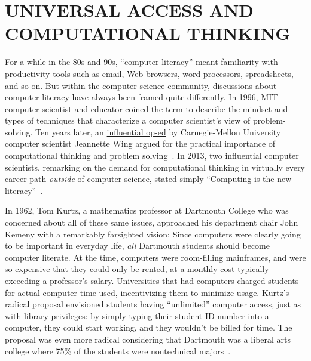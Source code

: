 
\section{UNIVERSAL ACCESS AND COMPUTATIONAL THINKING}




For a while in the 80s and 90s, ``computer literacy'' meant familiarity
with productivity tools such as email, Web browsers, word processors,
spreadsheets, and so on.
But within the computer science community, discussions about computer
literacy have always been framed quite differently.
In 1996, MIT computer scientist and educator  coined
the term  to describe the mindset and types of
techniques that characterize a computer scientist's view of
problem-solving.
Ten years later, an
\href{http://www.cs.cmu.edu/afs/cs/usr/wing/www/publications/Wing06.pdf}{influential
op-ed} by Carnegie-Mellon University computer scientist Jeannette Wing
argued for the practical importance of computational thinking and
problem solving~\cite{wing_computational_thinking}.
In 2013, two influential computer scientists, remarking on the demand
for computational thinking in virtually every career path \emph{outside}
of computer science,
stated simply
``Computing is the new
literacy''~\cite{ieee_computer_special_issue_computing_education}.

In 1962, Tom Kurtz, a mathematics professor at Dartmouth College who was
concerned about
all of these same issues, approached his department chair John Kemeny
with a remarkably farsighted vision: Since computers were clearly going
to be important in everyday life, \emph{all} Dartmouth students should
become computer literate.
At the time,
computers were room-filling mainframes, and were so expensive
that they could only be rented, at a monthly cost typically exceeding a
professor's salary.
Universities that had computers charged students for actual
computer time used, incentivizing them to minimize usage.
Kurtz's radical proposal envisioned students
having ``unlimited'' computer access, just as with library privileges:
by simply typing their student ID number into a
computer, they could start working, and they wouldn't be billed for
time.
The proposal was even more radical considering that Dartmouth was 
a liberal arts 
college where 75\% of the students were nontechnical majors~\cite{goto}.

